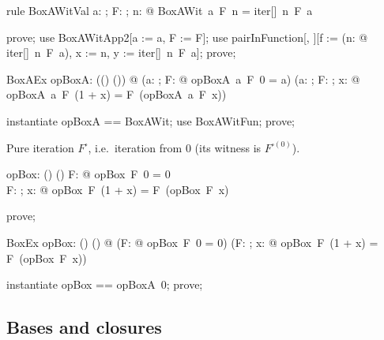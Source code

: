 \documentclass{article}
\begin{document}
\begin{theorem}{rule BoxAWitVal}
  \forall a: \nat; F: \nat \fun \nat; n: \nat @ BoxAWit~a~F~n = iter[\nat]~n~F~a
\end{theorem}

\begin{zproof}
prove;
use BoxAWitApp2[a := a, F := F];
use pairInFunction[\nat, \nat][f := (\lambda n: \nat @ iter[\nat]~n~F~a), x := n, y := iter[\nat]~n~F~a];
prove;
\end{zproof}

\begin{theorem}{BoxAEx}
  \exists opBoxA: \nat \fun ((\nat \fun \nat) \fun (\nat \fun \nat)) @
    (\forall a: \nat; F: \nat \fun \nat @ opBoxA~a~F~0 = a)
    \land (\forall a: \nat; F: \nat \fun \nat; x: \nat @ opBoxA~a~F~(1 + x) = F~(opBoxA~a~F~x))
\end{theorem}

\begin{zproof}
instantiate opBoxA == BoxAWit;
use BoxAWitFun;
prove;
\end{zproof}

Pure iteration $F^\square$, i.e.\ iteration from $0$ (its witness is $F^{\square(0)}$).

\begin{axdef}
  opBox: (\nat \fun \nat) \fun (\nat \fun \nat)
\where
   \forall F: \nat \fun \nat @ opBox~F~0 = 0 \\
   \forall F: \nat \fun \nat; x: \nat @ opBox~F~(1 + x) = F~(opBox~F~x)
\end{axdef}

\begin{zproof}
prove;
\end{zproof}

\begin{theorem}{BoxEx}
  \exists opBox: (\nat \fun \nat) \fun (\nat \fun \nat) @
    (\forall F: \nat \fun \nat @ opBox~F~0 = 0)
    \land (\forall F: \nat \fun \nat; x: \nat @ opBox~F~(1 + x) = F~(opBox~F~x))
\end{theorem}

\begin{zproof}
instantiate opBox == opBoxA~0;
prove;
\end{zproof}

\subsection{Bases and closures}
\end{document}
